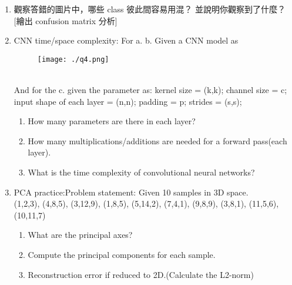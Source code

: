 \documentclass[12pt, a4paper]{article}
\begin{document}
\begin{enumerate}
\item 觀察答錯的圖片中，哪些 class 彼此間容易用混？ 並說明你觀察到了什麼？ [繪出 confusion matrix 分析]\\

\item CNN time/space complexity: For a. b. Given a CNN model as
\begin{figure}[ht]
    \centering
    \texttt{[image: ./q4.png]}
\end{figure}\\
And for the c. given the parameter as:
kernel size = (k,k);
channel size = c;
input shape of each layer = (n,n);
padding = p;
strides = (s,s);
\begin{enumerate}
    \item How many parameters are there in each layer?\\

    \item How many multiplications/additions are needed for a forward pass(each layer).\\
    
    \item What is the time complexity of convolutional neural networks?\\

\end{enumerate}

\item PCA practice:Problem statement: Given 10 samples in 3D space.\\
(1,2,3), (4,8,5), (3,12,9), (1,8,5), (5,14,2), (7,4,1), (9,8,9), (3,8,1), (11,5,6), (10,11,7)\\
\begin{enumerate}
    \item What are the principal axes?\\

    \item Compute the principal components for each sample.\\

    \item Reconstruction error if reduced to 2D.(Calculate the L2-norm)\\

\end{enumerate}

\end{enumerate}
\end{document}

